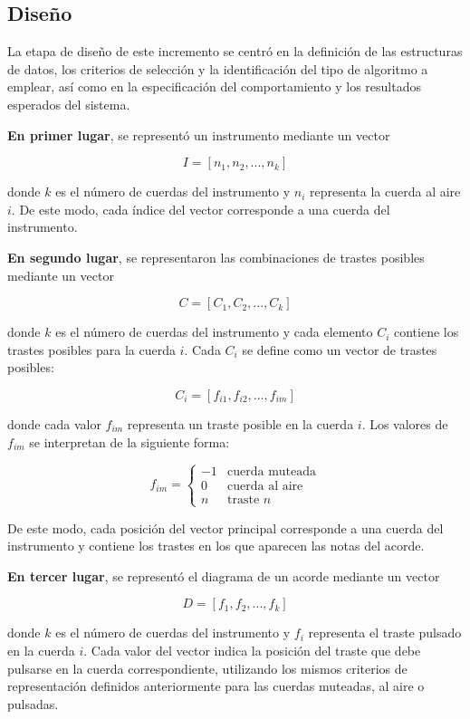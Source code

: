 \subsection{Diseño}

La etapa de diseño de este incremento se centró en la definición de las estructuras de datos, los criterios de selección y la identificación del tipo de algoritmo a emplear, así como en la especificación del comportamiento y los resultados esperados del sistema.

\textbf{En primer lugar}, se representó un instrumento mediante un vector

\[
I = [n_1, n_2, ..., n_k]
\]

donde \(k\) es el número de cuerdas del instrumento y \(n_i\) representa la \gls{cuerda al aire} \(i\). De este modo, cada índice del vector corresponde a una cuerda del instrumento.

\textbf{En segundo lugar}, se representaron las combinaciones de \gls{traste}s posibles mediante un vector

\[
C = [C_1, C_2, ..., C_k]
\]

donde \(k\) es el número de cuerdas del instrumento y cada elemento \(C_i\) contiene los trastes posibles para la cuerda \(i\). Cada \(C_i\) se define como un vector de trastes posibles:

\[
C_i = [f_{i1}, f_{i2}, ..., f_{im}]
\]

donde cada valor \(f_{im}\) representa un traste posible en la cuerda \(i\). Los valores de \(f_{im}\) se interpretan de la siguiente forma:

\[
f_{im} =
\begin{cases}
-1 & \text{cuerda muteada} \\
0 & \text{cuerda al aire} \\
n & \text{traste } n
\end{cases}
\]

De este modo, cada posición del vector principal corresponde a una cuerda del instrumento y contiene los trastes en los que aparecen las notas del acorde.

\textbf{En tercer lugar}, se representó el diagrama de un acorde mediante un vector

\[
D = [f_1, f_2, ..., f_k]
\]

donde \(k\) es el número de cuerdas del instrumento y \(f_i\) representa el traste pulsado en la cuerda \(i\). Cada valor del vector indica la posición del traste que debe pulsarse en la cuerda correspondiente, utilizando los mismos criterios de representación definidos anteriormente para las cuerdas muteadas, al aire o pulsadas.

